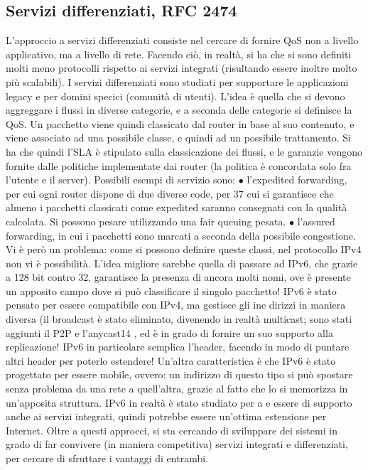 \subsection{Servizi differenziati, RFC 2474}
L'approccio a servizi differenziati consiste nel cercare di fornire QoS non a livello
applicativo, ma a livello di rete. Facendo ciò, in realtà, si ha che si sono definiti
molti meno protocolli rispetto ai servizi integrati (risultando essere inoltre molto
più scalabili). I servizi differenziati sono studiati per supportare le applicazioni
legacy e per domini specici (comunità di utenti). L'idea è quella che si devono
aggreggare i flussi in diverse categorie, e a seconda delle categorie si definisce la
QoS. Un pacchetto viene quindi classicato dal router in base al suo contenuto,
e viene associato ad una possibile classe, e quindi ad un possibile trattamento.
Si ha che quindi l'SLA è stipulato sulla classicazione dei flussi, e le garanzie
vengono fornite dalle politiche implementate dai router (la politica è concordata
solo fra l'utente e il server).
Possibili esempi di servizio sono:
$\bullet$ l'expedited forwarding, per cui ogni router dispone di due diverse code, per
37
cui si garantisce che almeno i pacchetti classicati come expedited saranno
consegnati con la qualità calcolata. Si possono pesare utilizzando una fair
queuing pesata.
$\bullet$ l'assured forwarding, in cui i pacchetti sono marcati a seconda della possibile congestione.
Vi è però un problema: come si possono definire queste classi, nel protocollo
IPv4 non vi è possibilità. L'idea migliore sarebbe quella di passare ad IPv6, che
grazie a 128 bit contro 32, garantisce la presenza di ancora molti nomi, ove è
presente un apposito campo dove si può classificare il singolo pacchetto!
IPv6 è stato pensato per essere compatibile con IPv4, ma gestisce gli ine
dirizzi in maniera diversa (il broadcast è stato eliminato, divenendo in realtà
multicast; sono stati aggiunti il P2P e l'anycast14 , ed è in grado di fornire un
suo supporto alla replicazione! IPv6 in particolare semplica l'header, facendo
in modo di puntare altri header per poterlo estendere! Un'altra caratteristica
è che IPv6 è stato progettato per essere mobile, ovvero: un indirizzo di questo
tipo si può spostare senza problema da una rete a quell'altra, grazie al fatto che
lo si memorizza in un'apposita struttura. IPv6 in realtà è stato studiato per
a e
essere di supporto anche ai servizi integrati, quindi potrebbe essere un'ottima
estensione per Internet.
Oltre a questi approcci, si sta cercando di sviluppare dei sistemi in grado
di far convivere (in maniera competitiva) servizi integrati e differenziati, per
cercare di sfruttare i vantaggi di entrambi.
